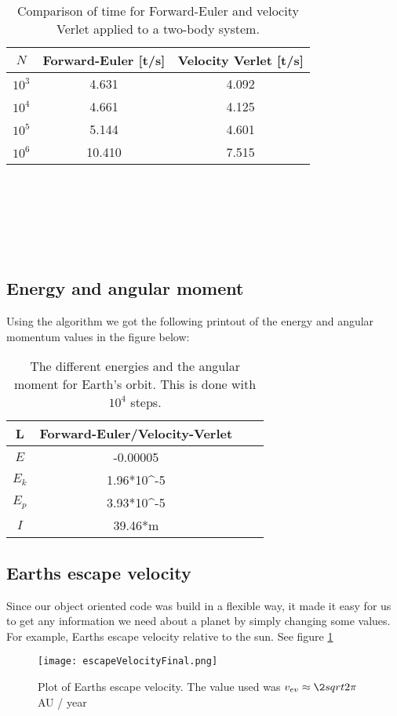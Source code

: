 \documentclass{article}
\begin{document}
\begin{table}[H]
	\centering
	\caption{Comparison of time for  Forward-Euler and velocity Verlet applied to a two-body system. }
	\begin{tabular}{ccc} \hline
	$N$ & Forward-Euler [t/s] & Velocity Verlet [t/s] \\ \hline
	$10^{3}$ & 4.631 &  4.092  \\
	$10^{4}$ & 4.661  & 4.125   \\

$10^{5}$ & 5.144  & 4.601  \\
	$10^{6}$ & 10.410 & 7.515 \\ \hline
	\end{tabular}
\end{table}
\\\\\\\\\\
\subsection{Energy and angular moment}
Using the algorithm we got the following printout of the energy and angular momentum values in the figure below:
	\begin{table}[H]
			\centering
			\caption{The different energies and the angular moment for Earth's orbit. This is done with $10^4$  steps.}
			\label{table: CEtable}
			\begin{tabular}{|c|c|c|c|}
\hline
\textbf{L} 	&	\textbf{Forward-Euler/Velocity-Verlet}	\\\hline 
\textbf{$E$}  & -0.00005         \\\hline 
\textbf{$E_{k}$}   & 1.96*10^-5      \\\hline 
\textbf{$E_{p}$}   &  3.93*10^-5   \\\hline 
\textbf{$I$}   &39.46*m    \\\hline
			\end{tabular}
		\end{table}

\subsection{Earths escape velocity}
Since our object oriented code was build in a flexible way, it made it easy for us to get any information we need about a planet by simply changing some values. For example, Earths escape velocity relative to the sun. See figure \ref{fig: escape}
\begin{figure}[H]
	\centering
	\texttt{[image: escapeVelocityFinal.png]}
	\centering
	\caption{ Plot of Earths escape velocity. The value used was $v_{ev}\approx \2sqrt{2}\pi$ AU / year }
	\label{fig: escape}
\end{figure}
\end{document}
